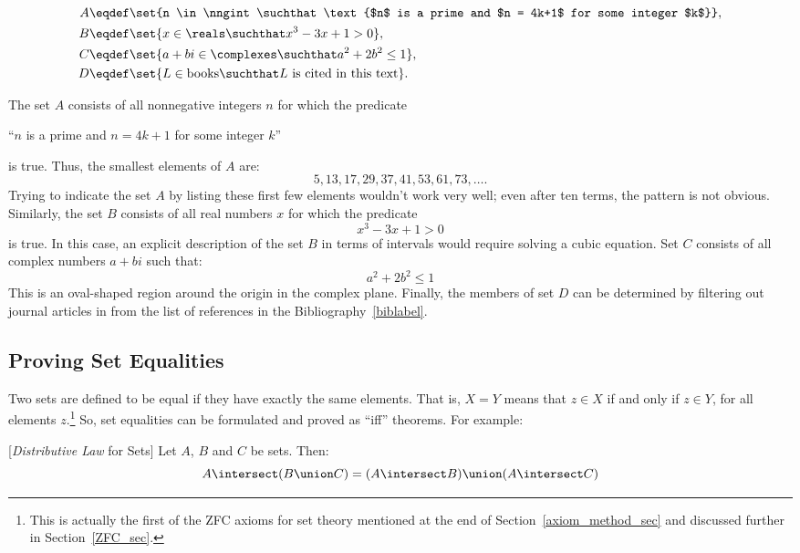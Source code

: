 \begin{align*}
A & \eqdef \set{n \in \nngint \suchthat \text{$n$ is a prime and $n =
    4k+1$ for some integer $k$}}, \\
B & \eqdef \set{x \in \reals \suchthat x^3 - 3 x + 1 > 0}, \\
C & \eqdef \set{a + b i \in \complexes \suchthat a^2 + 2 b^2 \leq 1},\\
D & \eqdef \set{L \in \text{books} \suchthat L\text{ is cited in this text}}.
\end{align*}

The set $A$ consists of all nonnegative integers $n$ for which the
predicate
\begin{center}
``$n$ is a prime and $n = 4k+1$ for some integer $k$''
\end{center}
is true.  Thus, the smallest elements of $A$ are:
\[
5, 13, 17, 29, 37, 41, 53, 61, 73, \dots.
\]
Trying to indicate the set $A$ by listing these first few elements
wouldn't work very well; even after ten terms, the pattern is not
obvious.  Similarly, the set $B$ consists of all real numbers $x$ for
which the predicate
\[
x^3 - 3x + 1 > 0
\]
is true.  In this case, an explicit description of the set $B$ in
terms of intervals would require solving a cubic equation.  Set $C$
consists of all complex numbers $a + b i$ such that:
\[
a^2 + 2 b^2 \leq 1
\]
This is an oval-shaped region around the origin in the complex plane.
Finally, the members of set $D$ can be determined by filtering out
journal articles in from the list of references in the
Bibliography~\ref{biblabel}.

\subsection{Proving Set Equalities}\label{set_equality_sec}

Two sets are defined to be equal if they have exactly the same
elements.  That is, $X = Y$ means that $z \in X$ if and only if $z \in
Y$, for all elements $z$.\footnote{This is actually the first of the
  ZFC axioms%
for set theory mentioned at the end of
  Section~\ref{axiom_method_sec} and discussed further in
  Section~\ref{ZFC_sec}.}  So, set equalities can be formulated and
proved as ``iff'' theorems.  For example:

\begin{theorem}\label{thm:intersect-distributivity}[\emph{Distributive Law} for Sets]%
Let $A$, $B$ and $C$ be sets.  Then:
\begin{equation}\label{set-distrib}
A \intersect (B \union C) = (A \intersect B) \union (A \intersect C)
\end{equation}
\end{theorem}

